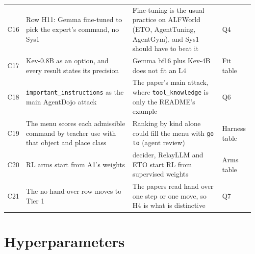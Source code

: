 \documentclass[10pt]{article}
\begin{document}
\begin{table}[H]
\begin{tabularx}{\linewidth}{@{}c P{5.6cm} L P{2.2cm}@{}}
C16 & Row H11: Gemma fine-tuned to pick the expert's command, no Sys1 & Fine-tuning is the usual practice on ALFWorld (ETO, AgentTuning, AgentGym), and Sys1 should have to beat it & Q4 \\
C17 & Kev-0.8B as an option, and every result states its precision & Gemma bf16 plus Kev-4B does not fit an L4 & Fit table \\
C18 & \texttt{important\_instructions} as the main AgentDojo attack & The paper's main attack, where \texttt{tool\_knowledge} is only the README's example & Q6 \\
C19 & The menu scores each admissible command by teacher use with that object and place class & Ranking by kind alone could fill the menu with \texttt{go to} (agent review) & Harness table \\
C20 & RL arms start from A1's weights & decider, RelayLLM and ETO start RL from supervised weights & Arms table \\
C21 & The no-hand-over row moves to Tier 1 & The papers read hand over one step or one move, so H4 is what is distinctive & Q7 \\
\bottomrule
\end{tabularx}
\end{table}

\section{Hyperparameters}
\end{document}

